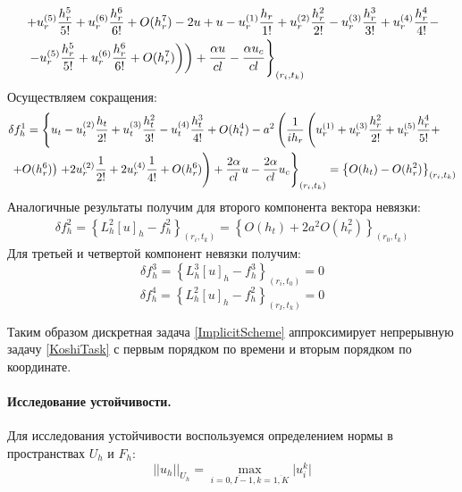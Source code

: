 \documentclass[a4paper,12pt,russian, fleqn]{extreport}
\begin{document}
 	\begin{align}
	 	& \left. + u^{(5)}_r\dfrac{h^5_r}{5!} + u^{(6)}_r\dfrac{h^6_r}{6!} + O(h_r^7) - 2u + u - u^{(1)}_r\dfrac{h_r}{1!} + u^{(2)}_r\dfrac{h^2_r}{2!} - u^{(3)}_r\dfrac{h^3_r}{3!} + u^{(4)}_r\dfrac{h^4_r}{4!} - \right. \nonumber \\
	 	& \left. \left. \left. - u^{(5)}_r\dfrac{h^5_r}{5!} + u^{(6)}_r\dfrac{h^6_r}{6!} + O(h_r^7)  \right) \right) + \dfrac{\strut \alpha u}{\strut cl} - \dfrac{\strut \alpha u_c}{cl}\right\}_{(r_i, t_k)} \nonumber
 	\end{align}
 	Осуществляем сокращения:
 	\begin{align}
 		& \delta f_h^1 = \left\{ u_t - u_t^{(2)}\dfrac{\strut h_t}{\strut 2!} +  u_t^{(3)}\dfrac{\strut h_t^2}{\strut 3!} -  u_t^{(4)}\dfrac{\strut h_t^3}{\strut 4!} + O(h_t^4) - a^2 \left( \dfrac{1}{ih_r}\left(u_r^{(1)} + u_r^{(3)}\dfrac{\strut h_r^2}{\strut 2!} + u_r^{(5)}\dfrac{\strut h_r^4}{\strut 5!} + \right. \right. \right. \nonumber  \\ 
 		& \left. \left. + O(h_r^6) \right) \left. + 2u_r^{(2)}\dfrac{\strut 1}{2!} + 2u_r^{(4)}\dfrac{\strut 1}{\strut 4!} + O(h_r^6) \right) + \dfrac{2\alpha}{cl}u - \dfrac{2\alpha}{cl}u_c \right\}_{(r_i, t_k)}  \nonumber = \left\{ O(h_t) - O(h_r^2) \right\}_{(r_i, t_k)}
 	\end{align}
 	Аналогичные результаты получим для второго компонента вектора невязки:
 	\begin{align}
	 	\delta f^2_h = \left\{ L^2_h[u]_h - f^2_h \right\} _{(r_i, t_k)} = \left\{ O(h_t) + 2a^2O(h_r^2)\right\}_{(r_0, t_k)} \nonumber
 	\end{align}	
 	Для третьей и четвертой компонент невязки получим:
 	\begin{equation*}
	 	\delta f^3_h = \left\{ L_h^3[u]_h - f^3_h \right\}_{(r_i, t_0)} = 0
 	\end{equation*}
 	\begin{equation*}
	 	\delta f^4_h = \left\{ L_h^2[u]_h - f^2_h \right\}_{(r_I, t_k)} = 0
 	\end{equation*}
 	
 	Таким образом дискретная задача \eqref{ImplicitScheme} аппроксимирует непрерывную задачу \eqref{KoshiTask} с первым порядком по времени и вторым порядком по координате.
 	
 	\paragraph{Исследование устойчивости.} Для исследования устойчивости воспользуемся определением нормы в пространствах $U_h$ и $F_h$:
 	\begin{equation*}
 		\lvert\lvert u_h \rvert\rvert_{U_h} = \max\limits_{i=\overline{0,I-1}, k=\overline{1,K}} {\vert u_i^k \vert}
 	\end{equation*}
 	
\end{document}
